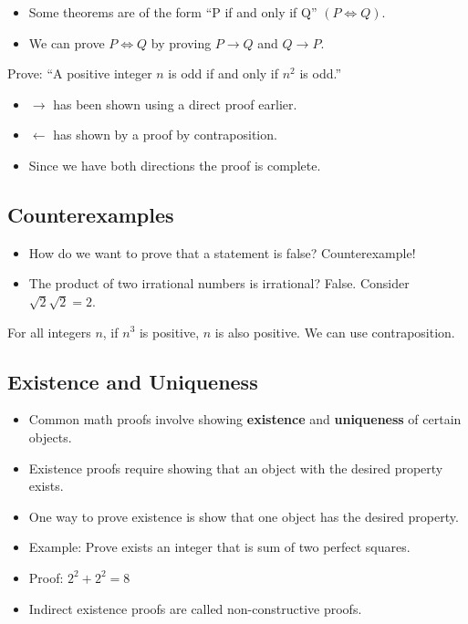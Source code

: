 \documentclass[8pt]{scrreprt}
\begin{document}
\begin{landscape}
\begin{multicols*}{3}
\begin{itemize}
	\item Some theorems are of the form ``P if and only if Q'' $(P\iff Q)$.
	\item We can prove $P\iff Q$ by proving $P\rightarrow Q$ and $Q\rightarrow P$.
\end{itemize}

\begin{example}
	Prove: ``A positive integer $n$ is odd if and only if $n^2$ is odd.''

	\begin{itemize}
		\item $\rightarrow$ has been shown using a direct proof earlier.
		\item $\leftarrow$ has shown by a proof by contraposition.
		\item Since we have both directions the proof is complete.
	\end{itemize}
\end{example}

\subsection{Counterexamples}
\begin{itemize}
	\item How do we want to prove that a statement is false? Counterexample!
	\item The product of two irrational numbers is irrational? False. Consider $\sqrt{2}\sqrt{2}=2$.
\end{itemize}

For all integers $n$, if $n^3$ is positive, $n$ is also positive. We can use contraposition.

\subsection{Existence and Uniqueness}

\begin{itemize}
	\item Common math proofs involve showing \textbf{existence} and \textbf{uniqueness}
	      of certain objects.
	\item Existence proofs require showing that an object with the desired property exists.
	\item One way to prove existence is show that one object has the desired property.
	\item Example: Prove exists an integer that is sum of two perfect squares.
	\item Proof: $2^2+2^2=8$
	\item Indirect existence proofs are called non-constructive proofs.
\end{itemize}


\end{multicols*}
\end{landscape}
\end{document}
